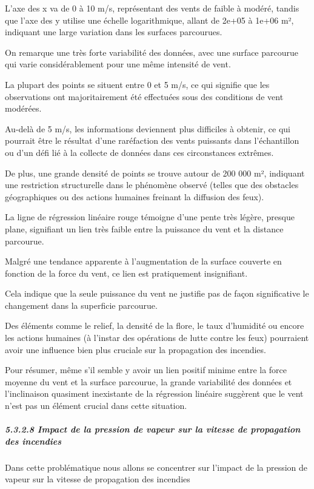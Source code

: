 \documentclass[
]{article}
\begin{document}
L'axe des x va de 0 à 10 m/s, représentant des vents de faible à modéré,
tandis que l'axe des y utilise une échelle logarithmique, allant de
2e+05 à 1e+06 m², indiquant une large variation dans les surfaces
parcourues.

On remarque une très forte variabilité des données, avec une surface
parcourue qui varie considérablement pour une même intensité de vent.

La plupart des points se situent entre 0 et 5 m/s, ce qui signifie que
les observations ont majoritairement été effectuées sous des conditions
de vent modérées.

Au-delà de 5 m/s, les informations deviennent plus difficiles à obtenir,
ce qui pourrait être le résultat d'une raréfaction des vents puissants
dans l'échantillon ou d'un défi lié à la collecte de données dans ces
circonstances extrêmes.

De plus, une grande densité de points se trouve autour de 200 000 m²,
indiquant une restriction structurelle dans le phénomène observé (telles
que des obstacles géographiques ou des actions humaines freinant la
diffusion des feux).

La ligne de régression linéaire rouge témoigne d'une pente très légère,
presque plane, signifiant un lien très faible entre la puissance du vent
et la distance parcourue.

Malgré une tendance apparente à l'augmentation de la surface couverte en
fonction de la force du vent, ce lien est pratiquement insignifiant.

Cela indique que la seule puissance du vent ne justifie pas de façon
significative le changement dans la superficie parcourue.

Des éléments comme le relief, la densité de la flore, le taux d'humidité
ou encore les actions humaines (à l'instar des opérations de lutte
contre les feux) pourraient avoir une influence bien plus cruciale sur
la propagation des incendies.

Pour résumer, même s'il semble y avoir un lien positif minime entre la
force moyenne du vent et la surface parcourue, la grande variabilité des
données et l'inclinaison quasiment inexistante de la régression linéaire
suggèrent que le vent n'est pas un élément crucial dans cette situation.

\subparagraph{5.3.2.8 Impact de la pression de vapeur sur la vitesse de
propagation des
incendies}\label{impact-de-la-pression-de-vapeur-sur-la-vitesse-de-propagation-des-incendies}

Dans cette problématique nous allons se concentrer sur l'impact de la
pression de vapeur sur la vitesse de propagation des incendies
\end{document}
